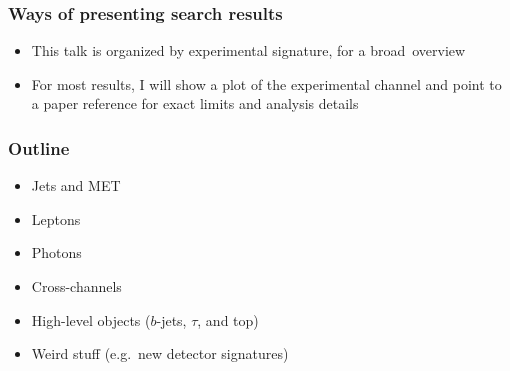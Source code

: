 \documentclass[compress]{beamer}
\begin{document}
\begin{frame}
\frametitle{Ways of presenting search results}


\begin{itemize}
\item<2-> This talk is organized by experimental signature, for a \mbox{broad overview\hspace{-1 cm}}

\item<3-> For most results, I will show a plot of the experimental channel and point to a paper reference for exact limits and analysis details
\end{itemize}
\end{frame}

\begin{frame}
\frametitle{Outline}
\begin{center}
\begin{minipage}{0.8\linewidth}
\begin{itemize}\setlength{\itemsep}{0.35 cm}
\item Jets and MET
\item Leptons
\item Photons
\item Cross-channels
\item High-level objects ($b$-jets, $\tau$, and top)
\item Weird stuff (e.g.\ new detector signatures)
\end{itemize}
\end{minipage}
\end{center}

\end{frame}
\end{document}
